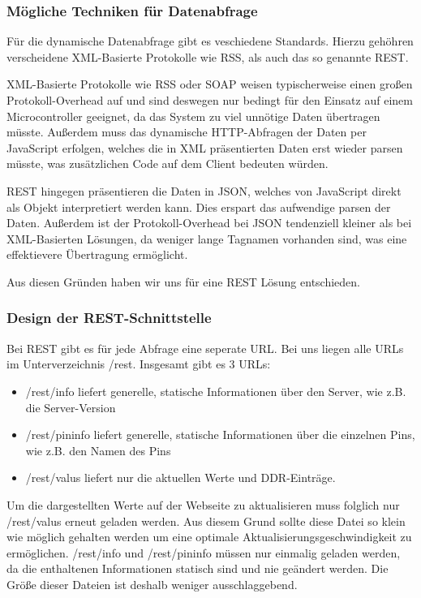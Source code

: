 \subsubsection{Mögliche Techniken für Datenabfrage}

Für die dynamische Datenabfrage gibt es veschiedene Standards. Hierzu gehöhren
verscheidene \ac{XML}-Basierte Protokolle wie RSS, als auch das so genannte
\ac{REST}.

\ac{XML}-Basierte Protokolle wie \ac{RSS} oder \ac{SOAP} weisen typischerweise
einen großen Protokoll-Overhead auf und sind deswegen nur bedingt für den Einsatz auf einem
Microcontroller geeignet, da das System zu viel unnötige Daten übertragen
müsste. Außerdem muss das dynamische \ac{HTTP}-Abfragen der Daten per JavaScript
erfolgen, welches die in \ac{XML} präsentierten Daten erst wieder parsen müsste, was
zusätzlichen Code auf dem Client bedeuten würden.

\ac{REST} hingegen präsentieren die Daten in \ac{JSON}, welches von
JavaScript direkt als Objekt interpretiert werden kann. Dies erspart das
aufwendige parsen der Daten. Außerdem ist der Protokoll-Overhead bei \ac{JSON}
tendenziell kleiner als bei \ac{XML}-Basierten Lösungen, da weniger lange Tagnamen
vorhanden sind, was eine effektievere Übertragung ermöglicht.

Aus diesen Gründen haben wir uns für eine \ac{REST} Lösung entschieden.

\subsubsection{Design der REST-Schnittstelle}
Bei \ac{REST} gibt es für jede Abfrage eine seperate \ac{URL}. Bei uns liegen
alle URLs im Unterverzeichnis \textrm{/rest}. Insgesamt gibt es 3 URLs:
\begin{itemize}
  \item  \textrm{/rest/info} liefert generelle, statische Informationen über den
  Server, wie z.B. die Server-Version
  \item  \textrm{/rest/pininfo} liefert generelle, statische Informationen über
  die einzelnen Pins, wie z.B. den Namen des Pins
  \item  \textrm{/rest/valus} liefert nur die aktuellen Werte und
  \ac{DDR}-Einträge.
\end{itemize}

Um die dargestellten Werte auf der Webseite zu aktualisieren muss folglich nur
\textrm{/rest/valus} erneut geladen werden. Aus diesem Grund sollte diese
Datei so klein wie möglich gehalten werden um eine optimale
Aktualisierungsgeschwindigkeit zu ermöglichen. \textrm{/rest/info} und  
\textrm{/rest/pininfo} müssen nur einmalig geladen werden, da die enthaltenen
Informationen statisch sind und nie geändert werden. Die Größe dieser Dateien
ist deshalb weniger ausschlaggebend.
